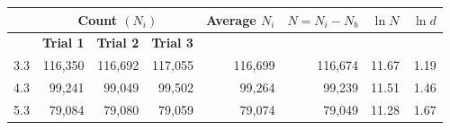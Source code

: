 \begin{table}[h]
	\begin{tabular}{|l|r|r|r|r|r|r|r|}
		\hline
		\rowcolor[HTML]{EFEFEF} 
		\multicolumn{1}{|c|}{\cellcolor[HTML]{EFEFEF}\textbf{Distance}} & \multicolumn{3}{c|}{\cellcolor[HTML]{EFEFEF}\textbf{Count $ (N_i)$}}                                                                                                                              & \multicolumn{1}{c|}{\cellcolor[HTML]{EFEFEF}\textbf{Average }$ N_i $} & \multicolumn{1}{c|}{\cellcolor[HTML]{EFEFEF}$ N = N_i-N_b $} & \multicolumn{1}{c|}{\cellcolor[HTML]{EFEFEF}$ \ln N $} & \multicolumn{1}{c|}{\cellcolor[HTML]{EFEFEF}$ \ln d $} \\ \hline
		\rowcolor[HTML]{EFEFEF} 
		& \multicolumn{1}{c|}{\cellcolor[HTML]{EFEFEF}\textbf{Trial 1}} & \multicolumn{1}{c|}{\cellcolor[HTML]{EFEFEF}\textbf{Trial 2}} & \multicolumn{1}{c|}{\cellcolor[HTML]{EFEFEF}\textbf{Trial 3}} & \multicolumn{1}{l|}{\cellcolor[HTML]{EFEFEF}}                    & \multicolumn{1}{l|}{\cellcolor[HTML]{EFEFEF}}                   & \multicolumn{1}{l|}{\cellcolor[HTML]{EFEFEF}}              & \multicolumn{1}{l|}{\cellcolor[HTML]{EFEFEF}}              \\ \hline
		3.3                                                             & 116,350                                                       & 116,692                                                       & 117,055                                                       & 116,699                                                          & 116,674                                                         & 11.67                                                      & 1.19                                                       \\ \hline
		4.3                                                             & 99,241                                                        & 99,049                                                        & 99,502                                                        & 99,264                                                           & 99,239                                                          & 11.51                                                      & 1.46                                                       \\ \hline
		5.3                                                             & 79,084                                                        & 79,080                                                        & 79,059                                                        & 79,074                                                           & 79,049                                                          & 11.28                                                      & 1.67                                                       \\ \hline

\end{tabular}
\end{table}
